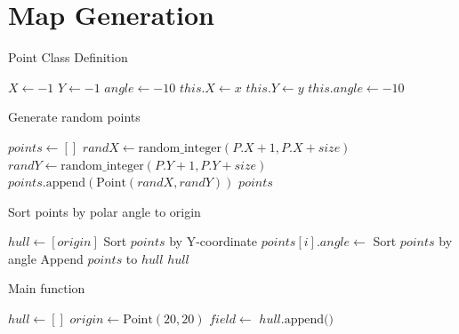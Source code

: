 \documentclass[final]{cmpreport_02}
\begin{document}
\clearpage



\appendix
\clearpage

\section{Map Generation}

\begin{algorithm}[h!]
	\caption{Point Class Definition}
	\label{mg:point class}
	\begin{algorithmic}[1]
		\State $X \gets -1$ 
		\State $Y \gets -1$ 
		\State $angle \gets -10$ 
		\State $this.X \gets x$
		\State $this.Y \gets y$
		\State $this.angle \gets -10$ 
		\EndProcedure
		\EndProcedure
	\end{algorithmic}
\end{algorithm}

\begin{algorithm}[h!]
	\caption{Generate random points}
	\label{mg:genPoints}
	\begin{algorithmic}[1]
		\State $points \gets []$
		\State $randX \gets \text{random\_integer}(P.X + 1, P.X + size)$
		\State $randY \gets \text{random\_integer}(P.Y + 1, P.Y + size)$
		\State $points.\text{append}(\text{Point}(randX, randY))$
		\EndFor
		\State \Return $points$
		\EndFunction
	\end{algorithmic}
\end{algorithm}

\begin{algorithm}[h!]
	\caption{Sort points by polar angle to origin}
	\label{mg:sortPoints}
	\begin{algorithmic}[1]
		\State $hull \gets [origin]$
		\State Sort $points$ by Y-coordinate
		\State $points[i].angle \gets$ 
		\EndFor
		\State Sort $points$ by angle
		\State Append $points$ to $hull$
		\State \Return $hull$
		\EndFunction
	\end{algorithmic}
\end{algorithm}

\begin{algorithm}[h!]
	\caption{Main function}
	\label{mg:main}
	\begin{algorithmic}[1]
		\State $hull \gets []$
		\State $origin \gets \text{Point}(20, 20)$
		\State $field \gets$ 
		\State $hull.\text{append}($$)$
		\EndFunction
	\end{algorithmic}
\end{algorithm}
\end{document}
